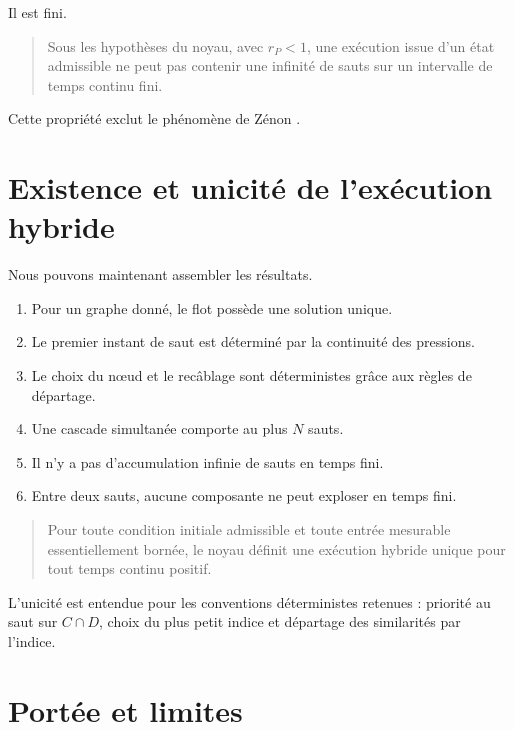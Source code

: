 Il est fini.

\begin{quote}
Sous les hypothèses du noyau, avec \(r_P<1\), une exécution issue d'un
état admissible ne peut pas contenir une infinité de sauts sur un
intervalle de temps continu fini.
\end{quote}

Cette propriété exclut le phénomène de Zénon
\cite{goebel2012hybrid}.

\section{Existence et unicité de l'exécution hybride}
\label{annexe-existence-hybride}

Nous pouvons maintenant assembler les résultats.

\begin{enumerate}
\item
  Pour un graphe donné, le flot possède une solution unique.
\item
  Le premier instant de saut est déterminé par la continuité des
  pressions.
\item
  Le choix du nœud et le recâblage sont déterministes grâce aux règles
  de départage.
\item
  Une cascade simultanée comporte au plus \(N\) sauts.
\item
  Il n'y a pas d'accumulation infinie de sauts en temps fini.
\item
  Entre deux sauts, aucune composante ne peut exploser en temps fini.
\end{enumerate}

\begin{quote}
Pour toute condition initiale admissible et toute entrée mesurable
essentiellement bornée, le noyau définit une exécution hybride unique
pour tout temps continu positif.
\end{quote}

L'unicité est entendue pour les conventions déterministes retenues :
priorité au saut sur \(C\cap D\), choix du plus petit indice et
départage des similarités par l'indice.

\section{Portée et limites}
\label{annexe-existence-limites}

